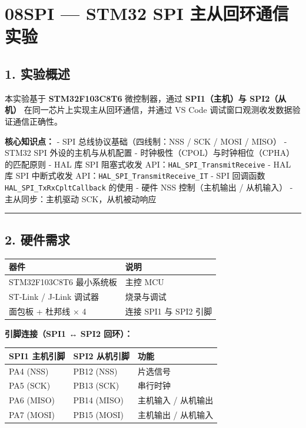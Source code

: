 \documentclass[
  chinese,
  UTF8,
  oneside,
  openany]{ctexbook}
\begin{document}
\chapter{08SPI --- STM32 SPI
主从回环通信实验}\label{spi-stm32-spi-ux4e3bux4eceux56deux73afux901aux4fe1ux5b9eux9a8c}

\section{1. 实验概述}\label{ux5b9eux9a8cux6982ux8ff0-3}

本实验基于 \textbf{STM32F103C8T6} 微控制器，通过 \textbf{SPI1（主机）与
SPI2（从机）} 在同一芯片上实现主从回环通信，并通过 VS Code
调试窗口观测收发数据验证通信正确性。

\textbf{核心知识点：} - SPI 总线协议基础（四线制：NSS / SCK / MOSI /
MISO） - STM32 SPI 外设的主机与从机配置 -
时钟极性（CPOL）与时钟相位（CPHA）的匹配原则 - HAL 库 SPI 阻塞式收发
API：\texttt{HAL\_SPI\_TransmitReceive} - HAL 库 SPI 中断式收发
API：\texttt{HAL\_SPI\_TransmitReceive\_IT} - SPI 回调函数
\texttt{HAL\_SPI\_TxRxCpltCallback} 的使用 - 硬件 NSS 控制（主机输出 /
从机输入） - 主从同步：主机驱动 SCK，从机被动响应

\begin{center}\rule{0.5\linewidth}{0.5pt}\end{center}

\section{2. 硬件需求}\label{ux786cux4ef6ux9700ux6c42-3}

\begin{longtable}[]{@{}ll@{}}
\toprule\noalign{}
器件 & 说明 \\
\midrule\noalign{}
\endhead
\bottomrule\noalign{}
\endlastfoot
STM32F103C8T6 最小系统板 & 主控 MCU \\
ST-Link / J-Link 调试器 & 烧录与调试 \\
面包板 + 杜邦线 × 4 & 连接 SPI1 与 SPI2 引脚 \\
\end{longtable}

\textbf{引脚连接（SPI1 ↔ SPI2 回环）：}

\begin{longtable}[]{@{}lll@{}}
\toprule\noalign{}
SPI1 主机引脚 & SPI2 从机引脚 & 功能 \\
\midrule\noalign{}
\endhead
\bottomrule\noalign{}
\endlastfoot
PA4 (NSS) & PB12 (NSS) & 片选信号 \\
PA5 (SCK) & PB13 (SCK) & 串行时钟 \\
PA6 (MISO) & PB14 (MISO) & 主机输入 / 从机输出 \\
PA7 (MOSI) & PB15 (MOSI) & 主机输出 / 从机输入 \\
\end{longtable}
\end{document}
